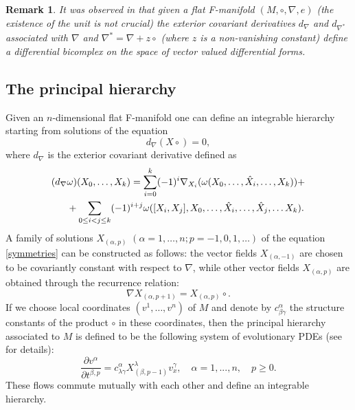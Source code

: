 \documentclass[11pt,a4paper]{amsart}
\numberwithin{equation}{section}
\newtheorem{remark}[theorem]{Remark}
\def\dna{d_{\nabla}}
\def\na{\nabla}
\def\dna{d_{\nabla}}
\def\na{\nabla}
\newcommand{\beq}{\begin{equation}}
\newcommand{\eeq}{\end{equation}}
\newcommand{\diff}[2]{\frac{\partial #1}{\partial #2}}
\newcommand{\qa}{\alpha}
\newcommand{\qb}{\beta}
\newcommand{\qg}{\gamma}
\newcommand{\ql}{\lambda}
\numberwithin{equation}{section}
\begin{document}
\begin{remark}
It was observed in \cite{ALimrn} that given a flat F-manifold $(M, \circ, \nabla, e)$ (the  existence of the unit is not crucial) the exterior covariant derivatives $d_{\nabla}$ and $d_{\nabla^*}$ associated  with $\nabla$ and $\nabla^*=\nabla+z\circ$
 (where $z$ is a non-vanishing constant) define a differential bicomplex on the space of vector valued differential forms.
 \end{remark}

\subsection{The principal hierarchy}
Given an $n$-dimensional flat F-manifold one can define an integrable hierarchy starting from solutions of the equation  
\begin{equation}\label{symmetries}
d_{\nabla}(X\circ)=0,
\end{equation}
where $d_{\nabla}$ is the exterior covariant derivative defined as
\begin{align}
  \label{AU}
  (\dna &\omega)(X_0, \dots, X_k)=\sum_{i=0}^k (-1)^i \na_{X_i}(\omega(X_0, \dots, \hat{X}_i, \dots, X_k))+\\
  \notag
  & +\sum_{0\leq i<j\leq k}(-1)^{i+j}\omega([X_i, X_j], X_0, \dots, \hat{X}_i, \dots, \hat{X}_j, \dots X_k).
\end{align}
A family of solutions $X_{(\qa,p)}$ $(\qa=1,\dots,n; p=-1,0,1,\dots)$ of the equation \eqref{symmetries} can be constructed as follows: the vector fields $X_{(\qa,-1)}$  are chosen to be covariantly constant with respect to $\nabla$, while other vector fields $X_{(\qa,p)}$ are obtained through the recurrence relation:
\beq\label{recurrenceeq1}
\nabla X_{(\qa,p+1)}=X_{(\qa,p)}\circ. 
\eeq 
If we choose local coordinates $(v^1,\dots,v^n)$ of $M$ and denote by $c^\qa_{\qb\qg}$ the structure constants of the product $\circ$ in these coordinates, then the principal hierarchy associated to $M$ is defined to be the following system of evolutionary PDEs (see \cite{LPR} for details):
\begin{equation}
  \label{AX}
\diff{v^\qa}{t^{\qb,p}}=c^\qa_{\ql\qg}X^\ql_{(\qb,p-1)}v^\qg_x,\quad \qa=1,...,n,\quad p\geq 0.
\end{equation}
These flows commute mutually with each other and define an integrable hierarchy.
\end{document}
